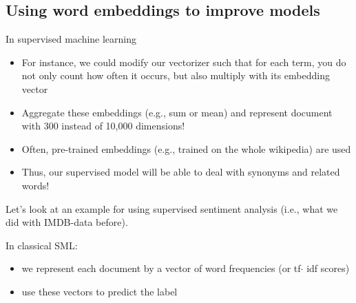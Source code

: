 


\subsection[Improving models]{Using word embeddings to improve models}


\begin{frame}{In supervised machine learning}
  \begin{itemize}[<+->]
  \item For instance, we could modify our vectorizer such that for each term, you do not only count how often it occurs, but also multiply with its embedding vector
  \item Aggregate these embeddings (e.g., sum or mean) and represent document with 300 instead of 10,000 dimensions!
  \item Often, pre-trained embeddings (e.g., trained on the whole wikipedia) are used
  \item Thus, our supervised model will be able to deal with synonyms and related words!
  \end{itemize}


  
  \pause 
  Let's look at an example for using supervised sentiment analysis (i.e., what we did with IMDB-data before).
  
	
\end{frame}



\begin{frame}{In classical SML:}
\begin{itemize}[<+->]
\item we represent each document by a vector of word frequencies (or tf$\cdot$ idf scores)
\item use these vectors to predict the label
\end{itemize}
\end{frame}


